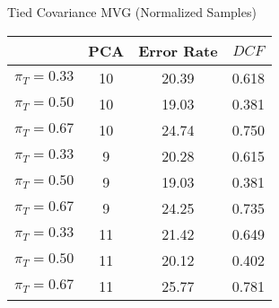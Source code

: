 \caption{Tied Covariance MVG (Normalized Samples)}\label{tab:mvgn_tiedcov}
\begin{center}
\begin{tabular}{|c|c||c|c|}
\hline
\ & PCA & Error Rate & $DCF$\\
\hline
$\pi_T = 0.33$ & 10 & 20.39 & 0.618 \\
$\pi_T = 0.50$ & 10 & 19.03 & 0.381 \\
$\pi_T = 0.67$ & 10 & 24.74 & 0.750 \\
\hline
$\pi_T = 0.33$ & 9 & 20.28 & 0.615 \\
$\pi_T = 0.50$ & 9 & 19.03 & 0.381 \\
$\pi_T = 0.67$ & 9 & 24.25 & 0.735 \\
\hline
$\pi_T = 0.33$ & 11 & 21.42 & 0.649 \\
$\pi_T = 0.50$ & 11 & 20.12 & 0.402 \\
$\pi_T = 0.67$ & 11 & 25.77 & 0.781 \\
\hline
\end{tabular}
\end{center}
